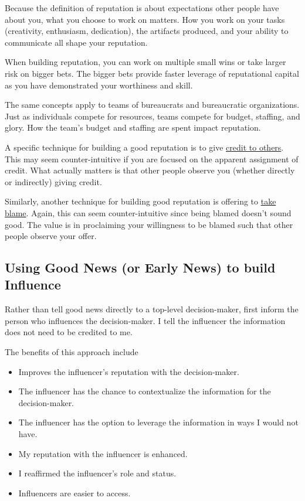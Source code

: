 Because the definition of reputation is about expectations other people have about you, what you choose to work on matters. How you work on your tasks (creativity, enthusiasm, dedication), the artifacts produced, and your ability to communicate all shape your reputation. 

When building reputation, you can work on multiple small wins or take larger risk on bigger bets. The bigger bets provide faster leverage of reputational capital as you have demonstrated your worthiness and skill. 

The same concepts apply to teams of bureaucrats and bureaucratic organizations. Just as individuals compete for resources, teams compete for budget, staffing, and glory. How the team's budget and staffing are spent impact reputation. 

A specific technique for building a good reputation is to give 
\hyperref[sec:credit-others]{credit to others}. 
This may seem counter-intuitive if you are focused on the apparent assignment of credit. What actually matters is that other people observe you (whether directly or indirectly) giving credit. 

Similarly, another technique for building good reputation is offering to \hyperref[sec:take-blame]{take blame}.
Again, this can seem counter-intuitive since being blamed doesn't sound good. The value is in proclaiming your willingness to be blamed such that other people observe your offer. 

\subsection*{Using Good News (or Early News) to build Influence}

Rather than tell good news directly to a top-level decision-maker, first inform the person who influences the decision-maker.
I tell the influencer the information does not need to be credited to me.

The benefits of this approach include
\begin{itemize}
    \item Improves the influencer's reputation with the decision-maker.
    \item The influencer has the chance to contextualize the information for the decision-maker.
    \item The influencer has the option to leverage the information in ways I would not have.
    \item My reputation with the influencer is enhanced.
    \item I reaffirmed the influencer's role and status.
    \item Influencers are easier to access.
\end{itemize}

